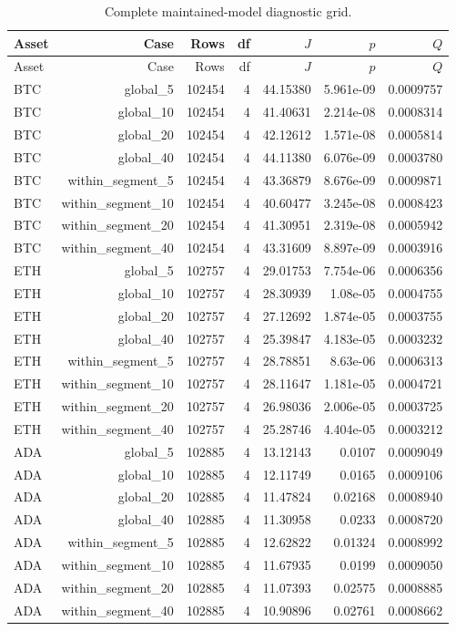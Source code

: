 \documentclass[10pt]{article}
\begin{document}
\small\setlength{\tabcolsep}{3pt}
\begin{longtable}{lrrrrrr}
\caption{Complete maintained-model diagnostic grid.}\label{tab:covariance_all_cases}\\
\toprule
Asset & Case & Rows & df & $J$ & $p$ & $Q$ \\\midrule\endfirsthead
\toprule
Asset & Case & Rows & df & $J$ & $p$ & $Q$ \\\midrule\endhead
BTC & global\_5 & 102454 & 4 & 44.15380 & 5.961e-09 & 0.0009757 \\
BTC & global\_10 & 102454 & 4 & 41.40631 & 2.214e-08 & 0.0008314 \\
BTC & global\_20 & 102454 & 4 & 42.12612 & 1.571e-08 & 0.0005814 \\
BTC & global\_40 & 102454 & 4 & 44.11380 & 6.076e-09 & 0.0003780 \\
BTC & within\_segment\_5 & 102454 & 4 & 43.36879 & 8.676e-09 & 0.0009871 \\
BTC & within\_segment\_10 & 102454 & 4 & 40.60477 & 3.245e-08 & 0.0008423 \\
BTC & within\_segment\_20 & 102454 & 4 & 41.30951 & 2.319e-08 & 0.0005942 \\
BTC & within\_segment\_40 & 102454 & 4 & 43.31609 & 8.897e-09 & 0.0003916 \\
ETH & global\_5 & 102757 & 4 & 29.01753 & 7.754e-06 & 0.0006356 \\
ETH & global\_10 & 102757 & 4 & 28.30939 & 1.08e-05 & 0.0004755 \\
ETH & global\_20 & 102757 & 4 & 27.12692 & 1.874e-05 & 0.0003755 \\
ETH & global\_40 & 102757 & 4 & 25.39847 & 4.183e-05 & 0.0003232 \\
ETH & within\_segment\_5 & 102757 & 4 & 28.78851 & 8.63e-06 & 0.0006313 \\
ETH & within\_segment\_10 & 102757 & 4 & 28.11647 & 1.181e-05 & 0.0004721 \\
ETH & within\_segment\_20 & 102757 & 4 & 26.98036 & 2.006e-05 & 0.0003725 \\
ETH & within\_segment\_40 & 102757 & 4 & 25.28746 & 4.404e-05 & 0.0003212 \\
ADA & global\_5 & 102885 & 4 & 13.12143 & 0.0107 & 0.0009049 \\
ADA & global\_10 & 102885 & 4 & 12.11749 & 0.0165 & 0.0009106 \\
ADA & global\_20 & 102885 & 4 & 11.47824 & 0.02168 & 0.0008940 \\
ADA & global\_40 & 102885 & 4 & 11.30958 & 0.0233 & 0.0008720 \\
ADA & within\_segment\_5 & 102885 & 4 & 12.62822 & 0.01324 & 0.0008992 \\
ADA & within\_segment\_10 & 102885 & 4 & 11.67935 & 0.0199 & 0.0009050 \\
ADA & within\_segment\_20 & 102885 & 4 & 11.07393 & 0.02575 & 0.0008885 \\
ADA & within\_segment\_40 & 102885 & 4 & 10.90896 & 0.02761 & 0.0008662 \\
\bottomrule\end{longtable}\normalsize
\end{document}
